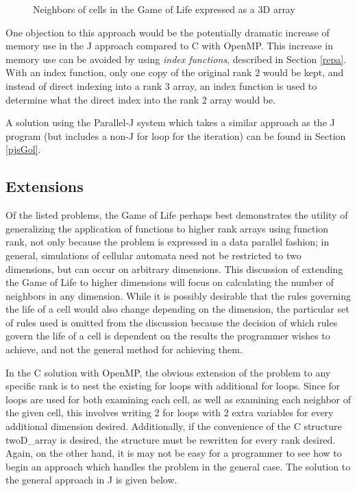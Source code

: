 \begin{figure}[h]
\begin{quote}
\begin{singlespacing}
\begin{small}
\end{small}
\end{singlespacing}
\end{quote}
\caption{Neighbors of cells in the Game of Life expressed as a 3D array}
\label{fig::gol_nei}
\end{figure}

One objection to this approach would be the potentially dramatic increase 
of memory use in the J approach compared to C with OpenMP. 
This increase in memory use can be avoided by using \textit{index functions}, described in Section \ref{repa}.
With an index function, only one copy of the original rank 2 would be kept, 
and instead of direct indexing into a rank 3 array, 
an index function is used to determine 
what the direct index into the rank 2 array would be.

A solution using the Parallel-J system which takes a similar approach as the J program 
(but includes a non-J for loop for the iteration)
can be found in Section \ref{pjsGol}.

\subsection{Extensions}
Of the listed problems, the Game of Life perhaps best demonstrates the utility 
of generalizing the application of functions to higher rank arrays using function rank, 
not only because the problem is expressed in a data parallel fashion; 
in general, simulations of cellular automata need not be restricted to two dimensions, 
but can occur on arbitrary dimensions.
This discussion of extending the Game of Life to higher dimensions 
will focus on calculating the number of neighbors in any dimension.
While it is possibly desirable that the rules governing the life of a cell 
would also change depending on the dimension, 
the particular set of rules used is omitted from the discussion because 
the decision of which rules govern the life of a cell is 
dependent on the results the programmer wishes to achieve, 
and not the general method for achieving them.

In the C solution with OpenMP, 
the obvious extension of the problem to any specific rank 
is to nest the existing for loops with additional for loops. 
Since for loops are used for both examining each cell, 
as well as examining each neighbor of the given cell, 
this involves writing 2 for loops with 2 extra variables for every additional dimension desired. 
Additionally, if the convenience of the C structure \ttfamily twoD\_array \normalfont is desired, 
the structure must be rewritten for every rank desired. 
Again, on the other hand, it is may not be easy for a programmer to see 
how to begin an approach which handles the problem in the general case.
The solution to the general approach in J is given below.

